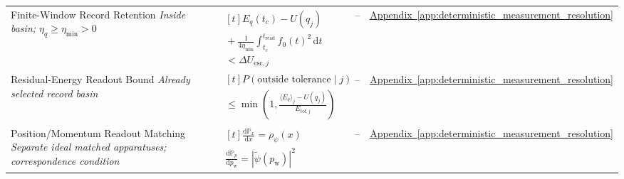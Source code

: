 \begin{longtable}{@{} p{4.5cm} p{6cm} c p{4cm} @{}}
{\raggedright Finite-Window Record Retention \newline \textit{Inside basin; $\eta_q\geq\eta_{\min}>0$}\par} & {\raggedright $\begin{gathered}[t]E_q(t_c)-U(q_j) \\ {}+\frac1{4\eta_{\min}}\int_{t_c}^{t_{\mathrm{read}}}f_0(t)^2\,\mathrm dt \\ <\Delta U_{\mathrm{esc},j}\end{gathered}$\par} & -- & {\raggedright \hyperref[app:deterministic_measurement_resolution]{Appendix~\ref*{app:deterministic_measurement_resolution}}\par} \\

{\raggedright Residual-Energy Readout Bound \newline \textit{Already selected record basin}\par} & {\raggedright $\begin{gathered}[t]P(\text{outside tolerance}\mid j) \\ \leq\min\!\left(1,\frac{\langle E_q\rangle_j-U(q_j)}{E_{\mathrm{tol},j}}\right)\end{gathered}$\par} & -- & {\raggedright \hyperref[app:deterministic_measurement_resolution]{Appendix~\ref*{app:deterministic_measurement_resolution}}\par} \\

{\raggedright Position/Momentum Readout Matching \newline \textit{Separate ideal matched apparatuses; correspondence condition}\par} & {\raggedright $\begin{gathered}[t]\frac{\mathrm d\mathbb P_x}{\mathrm dx}=\rho_\psi(x) \\ \frac{\mathrm d\mathbb P_p}{\mathrm dp_{\mathrm w}}=|\widetilde\psi(p_{\mathrm w})|^2\end{gathered}$\par} & -- & {\raggedright \hyperref[app:deterministic_measurement_resolution]{Appendix~\ref*{app:deterministic_measurement_resolution}}\par} \\


\end{longtable}
